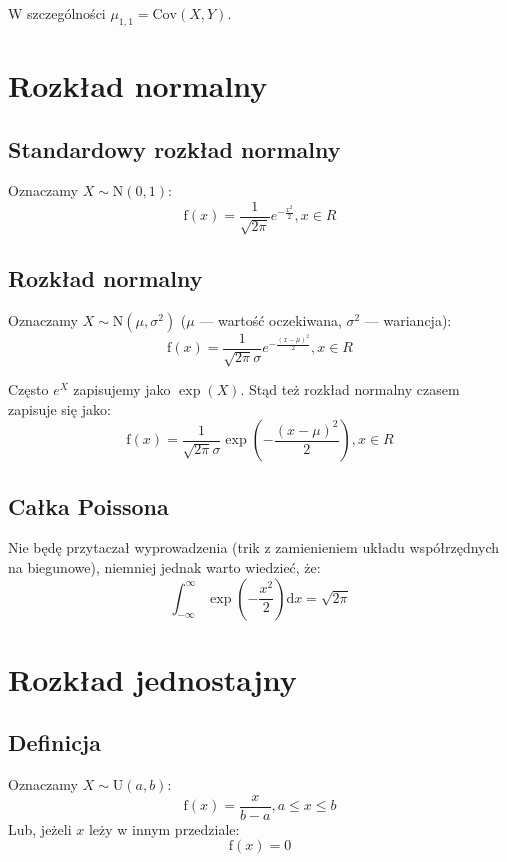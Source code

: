 \documentclass[a4paper,12pt]{article}
\begin{document}
W szczególności $\mu_{1,1} = \textrm{Cov}\left(X, Y\right)$.

\section{Rozkład normalny}

\subsection{Standardowy rozkład normalny}
Oznaczamy $X \sim \textrm{N}\left(0, 1\right)$:
\begin{equation}
\textrm{f}\left(x\right) = \frac{1}{\sqrt{2\pi}}e^{-\frac{x^2}{2}}, x \in {R}
\end{equation}

\subsection{Rozkład normalny}
Oznaczamy $X \sim \textrm{N}\left(\mu, \sigma^2\right)$ ($\mu$ --- wartość oczekiwana, $\sigma^2$ --- wariancja):
\begin{equation}
\textrm{f}\left(x\right) = \frac{1}{\sqrt{2\pi}\sigma}e^{-\frac{\left(x - \mu\right)^2}{2}}, x \in {R}
\end{equation}

Często $e^X$ zapisujemy jako $\exp\left({X}\right)$. Stąd też rozkład normalny czasem zapisuje się jako:
\begin{equation}
\textrm{f}\left(x\right) = \frac{1}{\sqrt{2\pi}\sigma}\exp\left(-\frac{\left(x - \mu\right)^2}{2}\right), x \in {R}
\end{equation}

\subsection{Całka Poissona}
Nie będę przytaczał wyprowadzenia (trik z zamienieniem układu współrzędnych na biegunowe), niemniej jednak warto wiedzieć, że:
\begin{equation}
\int_{-\infty}^{\infty}\exp\left(-\frac{x^2}{2}\right)\textrm{d}x = \sqrt{2\pi}
\end{equation}

\section{Rozkład jednostajny}
\subsection{Definicja}
Oznaczamy $X \sim \textrm{U}\left(a, b\right)$:
\begin{equation}
\textrm{f}\left(x\right) = \frac{x}{b-a}, a \leq x \leq b
\end{equation}
Lub, jeżeli $x$ leży w innym przedziale:
\begin{equation}
\textrm{f}\left(x\right) = 0
\end{equation}
\end{document}
